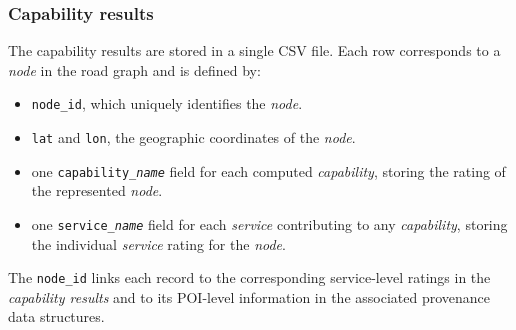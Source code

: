 \documentclass{article}
\begin{document}
\subsubsection*{Capability results}
The capability results are stored in a single CSV file. Each row corresponds to a \emph{node} in the road graph and is defined by:
\begin{itemize}
    \item \texttt{node\_id}, which uniquely identifies the \emph{node}.
    \item \texttt{lat} and \texttt{lon}, the geographic coordinates of the \emph{node}.
    \item one \texttt{capability\_\textnormal{\emph{name}}} field for each computed \emph{capability}, storing the rating of the represented \emph{node}.
    \item one \texttt{service\_\textnormal{\emph{name}}} field for each \emph{service} contributing to any \emph{capability}, storing the individual \emph{service} rating for the \emph{node}.
\end{itemize}
The \texttt{node\_id} links each record to the corresponding service-level ratings in the \emph{capability results} and to its POI-level information in the associated provenance data structures.
\end{document}
